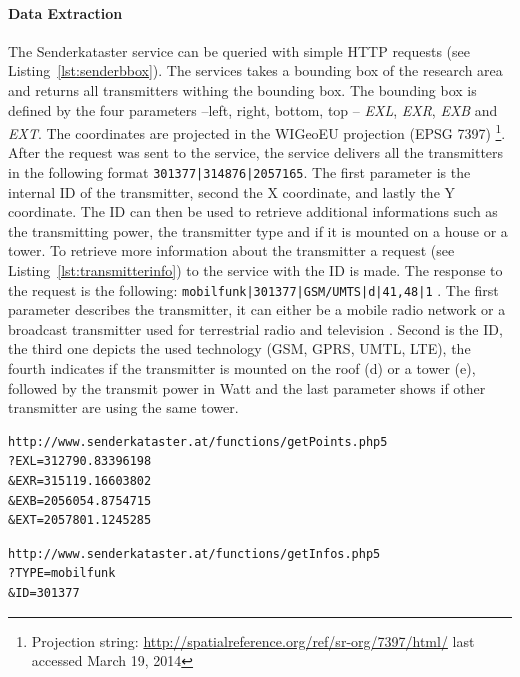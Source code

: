 \documentclass[master,english]{hgbthesis}
\begin{document}
\paragraph{Data Extraction}
The Senderkataster service can be queried with simple HTTP requests (see Listing~\ref{lst:senderbbox}). The services takes a bounding box of the research area and returns all transmitters withing the bounding box. The bounding box is defined by the four parameters --left, right, bottom, top -- \emph{EXL}, \emph{EXR}, \emph{EXB} and \emph{EXT}. The coordinates are projected in the WIGeoEU projection (EPSG 7397) \footnote{Projection string: \url{http://spatialreference.org/ref/sr-org/7397/html/} last accessed March 19, 2014}. After the request was sent to the service, the service delivers all the transmitters in the following format \lstinline+301377|314876|2057165+. The first parameter is the internal ID of the transmitter, second the X coordinate, and lastly the Y coordinate. The ID can then be used to retrieve additional informations such as the transmitting power, the transmitter type and if it is mounted on a house or a tower.
To retrieve more information about the transmitter a request (see Listing~\ref{lst:transmitterinfo}) to the service with the ID is made. The response to the request is the following: \lstinline+mobilfunk|301377|GSM/UMTS|d|41,48|1+ . The first parameter describes the transmitter, it can either be a mobile radio network or a broadcast transmitter used for terrestrial radio and television . Second is the ID, the third one depicts the used technology (GSM, GPRS, UMTL, LTE), the fourth indicates if the transmitter is mounted on the roof (d) or a tower (e), followed by the transmit power in Watt and the last parameter shows if other transmitter are using the same tower.
\begin{lstlisting}[caption=Request to retrieve station within the boudning box,label=lst:senderbbox]
http://www.senderkataster.at/functions/getPoints.php5
?EXL=312790.83396198
&EXR=315119.16603802
&EXB=2056054.8754715
&EXT=2057801.1245285
\end{lstlisting}
\begin{lstlisting}[caption=Request to retrieve transmitter information,label=lst:transmitterinfo]
http://www.senderkataster.at/functions/getInfos.php5
?TYPE=mobilfunk
&ID=301377
\end{lstlisting}
\end{document}
